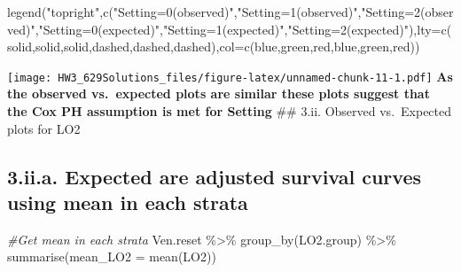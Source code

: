 \documentclass[
]{article}
\newenvironment{Shaded}{\begin{snugshade}}{\end{snugshade}}
\newcommand{\AttributeTok}[1]{\textcolor[rgb]{0.77,0.63,0.00}{#1}}
\newcommand{\CommentTok}[1]{\textcolor[rgb]{0.56,0.35,0.01}{\textit{#1}}}
\newcommand{\FunctionTok}[1]{\textcolor[rgb]{0.00,0.00,0.00}{#1}}
\newcommand{\NormalTok}[1]{#1}
\newcommand{\SpecialCharTok}[1]{\textcolor[rgb]{0.00,0.00,0.00}{#1}}
\newcommand{\StringTok}[1]{\textcolor[rgb]{0.31,0.60,0.02}{#1}}
\begin{document}
\begin{Shaded}
\begin{Highlighting}[]
\FunctionTok{legend}\NormalTok{(}\StringTok{"topright"}\NormalTok{,}\FunctionTok{c}\NormalTok{(}\StringTok{"Setting=0(observed)"}\NormalTok{,}\StringTok{"Setting=1(observed)"}\NormalTok{,}\StringTok{"Setting=2(observed)"}\NormalTok{,}\StringTok{"Setting=0(expected)"}\NormalTok{,}\StringTok{"Setting=1(expected)"}\NormalTok{,}\StringTok{"Setting=2(expected)"}\NormalTok{),}\AttributeTok{lty=}\FunctionTok{c}\NormalTok{(}\StringTok{\textquotesingle{}solid\textquotesingle{}}\NormalTok{,}\StringTok{\textquotesingle{}solid\textquotesingle{}}\NormalTok{,}\StringTok{\textquotesingle{}solid\textquotesingle{}}\NormalTok{,}\StringTok{\textquotesingle{}dashed\textquotesingle{}}\NormalTok{,}\StringTok{\textquotesingle{}dashed\textquotesingle{}}\NormalTok{,}\StringTok{\textquotesingle{}dashed\textquotesingle{}}\NormalTok{),}\AttributeTok{col=}\FunctionTok{c}\NormalTok{(}\StringTok{\textquotesingle{}blue\textquotesingle{}}\NormalTok{,}\StringTok{\textquotesingle{}green\textquotesingle{}}\NormalTok{,}\StringTok{\textquotesingle{}red\textquotesingle{}}\NormalTok{,}\StringTok{\textquotesingle{}blue\textquotesingle{}}\NormalTok{,}\StringTok{\textquotesingle{}green\textquotesingle{}}\NormalTok{,}\StringTok{\textquotesingle{}red\textquotesingle{}}\NormalTok{))}
\end{Highlighting}
\end{Shaded}

\texttt{[image: HW3\_629Solutions\_files/figure-latex/unnamed-chunk-11-1.pdf]}
\textbf{As the observed vs.~expected plots are similar these plots
suggest that the Cox PH assumption is met for Setting} \#\# 3.ii.
Observed vs.~Expected plots for LO2

\hypertarget{ii.a.-expected-are-adjusted-survival-curves-using-mean-in-each-strata}{%
\subsection{3.ii.a. Expected are adjusted survival curves using mean in
each
strata}\label{ii.a.-expected-are-adjusted-survival-curves-using-mean-in-each-strata}}

\begin{Shaded}
\begin{Highlighting}[]
\CommentTok{\#Get mean in each strata }
\NormalTok{Ven.reset }\SpecialCharTok{\%\textgreater{}\%}
  \FunctionTok{group\_by}\NormalTok{(LO2.group) }\SpecialCharTok{\%\textgreater{}\%}
  \FunctionTok{summarise}\NormalTok{(}\AttributeTok{mean\_LO2 =} \FunctionTok{mean}\NormalTok{(LO2))}
\end{Highlighting}
\end{Shaded}
\end{document}
